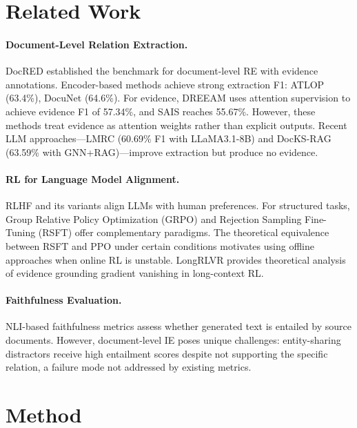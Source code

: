 \documentclass[11pt,a4paper]{article}
\begin{document}
\section{Related Work}

\paragraph{Document-Level Relation Extraction.}
DocRED \cite{yao2019docred} established the benchmark for document-level RE with evidence annotations. Encoder-based methods achieve strong extraction F1: ATLOP \cite{zhou2021atlop} (63.4\%), DocuNet \cite{zhang2021docunet} (64.6\%). For evidence, DREEAM \cite{tan2022dreeam} uses attention supervision to achieve evidence F1 of 57.34\%, and SAIS \cite{xiao2022sais} reaches 55.67\%. However, these methods treat evidence as attention weights rather than explicit outputs. Recent LLM approaches---LMRC \cite{xu2024lmrc} (60.69\% F1 with LLaMA3.1-8B) and DocKS-RAG \cite{docks2025} (63.59\% with GNN+RAG)---improve extraction but produce no evidence.

\paragraph{RL for Language Model Alignment.}
RLHF and its variants \cite{ouyang2022training,rafailov2023direct} align LLMs with human preferences. For structured tasks, Group Relative Policy Optimization (GRPO) \cite{shao2024deepseekmath} and Rejection Sampling Fine-Tuning (RSFT) \cite{yuan2024rrhf} offer complementary paradigms. The theoretical equivalence between RSFT and PPO under certain conditions \cite{tang2024rsftppo} motivates using offline approaches when online RL is unstable. LongRLVR \cite{song2026longrlvr} provides theoretical analysis of evidence grounding gradient vanishing in long-context RL.

\paragraph{Faithfulness Evaluation.}
NLI-based faithfulness metrics \cite{honovich2022true,laban2022summac} assess whether generated text is entailed by source documents. However, document-level IE poses unique challenges: entity-sharing distractors receive high entailment scores despite not supporting the specific relation, a failure mode not addressed by existing metrics.

\section{Method}
\end{document}
